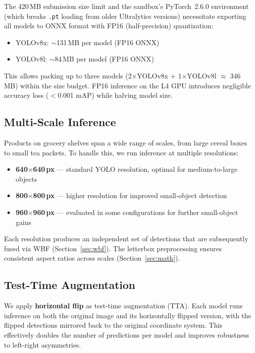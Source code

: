 \documentclass[11pt,a4paper]{article}
\begin{document}
The 420\,MB submission size limit and the sandbox's PyTorch~2.6.0 environment (which breaks \texttt{.pt} loading from older Ultralytics versions) necessitate exporting all models to ONNX format with FP16 (half-precision) quantization:
\begin{itemize}    \item YOLOv8x: $\sim$131\,MB per model (FP16 ONNX)
    \item YOLOv8l: $\sim$84\,MB per model (FP16 ONNX)
\end{itemize}
This allows packing up to three models (2$\times$YOLOv8x + 1$\times$YOLOv8l $\approx$ 346\,MB) within the size budget.
FP16 inference on the L4 GPU introduces negligible accuracy loss ($<$0.001 mAP) while halving model size.

\subsection{Multi-Scale Inference}
\label{sec:multiscale}

Products on grocery shelves span a wide range of scales, from large cereal boxes to small tea packets.
To handle this, we run inference at multiple resolutions:
\begin{itemize}    \item \textbf{640$\times$640\,px} --- standard YOLO resolution, optimal for medium-to-large objects
    \item \textbf{800$\times$800\,px} --- higher resolution for improved small-object detection
    \item \textbf{960$\times$960\,px} --- evaluated in some configurations for further small-object gains
\end{itemize}

Each resolution produces an independent set of detections that are subsequently fused via WBF (Section~\ref{sec:wbf}).
The letterbox preprocessing ensures consistent aspect ratios across scales (Section~\ref{sec:math}).

\subsection{Test-Time Augmentation}
\label{sec:tta}

We apply \textbf{horizontal flip} as test-time augmentation (TTA).
Each model runs inference on both the original image and its horizontally flipped version, with the flipped detections mirrored back to the original coordinate system.
This effectively doubles the number of predictions per model and improves robustness to left-right asymmetries.
\end{document}

